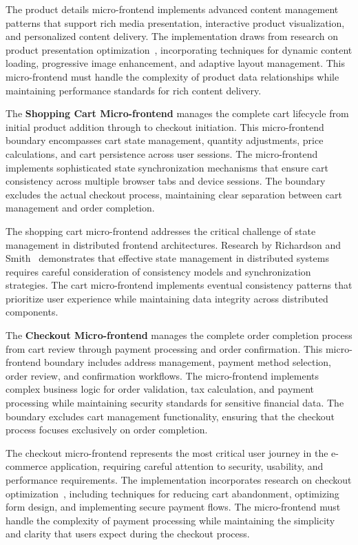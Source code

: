 \documentclass[12pt,a4paper]{report}
\begin{document}
The product details micro-frontend implements advanced content management patterns that support rich media presentation, interactive product visualization, and personalized content delivery. The implementation draws from research on product presentation optimization~\cite{liu2010product}, incorporating techniques for dynamic content loading, progressive image enhancement, and adaptive layout management. This micro-frontend must handle the complexity of product data relationships while maintaining performance standards for rich content delivery.

The \textbf{Shopping Cart Micro-frontend} manages the complete cart lifecycle from initial product addition through to checkout initiation. This micro-frontend boundary encompasses cart state management, quantity adjustments, price calculations, and cart persistence across user sessions. The micro-frontend implements sophisticated state synchronization mechanisms that ensure cart consistency across multiple browser tabs and device sessions. The boundary excludes the actual checkout process, maintaining clear separation between cart management and order completion.

The shopping cart micro-frontend addresses the critical challenge of state management in distributed frontend architectures. Research by Richardson and Smith~\cite{richardson2018microservices} demonstrates that effective state management in distributed systems requires careful consideration of consistency models and synchronization strategies. The cart micro-frontend implements eventual consistency patterns that prioritize user experience while maintaining data integrity across distributed components.

The \textbf{Checkout Micro-frontend} manages the complete order completion process from cart review through payment processing and order confirmation. This micro-frontend boundary includes address management, payment method selection, order review, and confirmation workflows. The micro-frontend implements complex business logic for order validation, tax calculation, and payment processing while maintaining security standards for sensitive financial data. The boundary excludes cart management functionality, ensuring that the checkout process focuses exclusively on order completion.

The checkout micro-frontend represents the most critical user journey in the e-commerce application, requiring careful attention to security, usability, and performance requirements. The implementation incorporates research on checkout optimization~\cite{baymard2019checkout}, including techniques for reducing cart abandonment, optimizing form design, and implementing secure payment flows. The micro-frontend must handle the complexity of payment processing while maintaining the simplicity and clarity that users expect during the checkout process.
\end{document}
